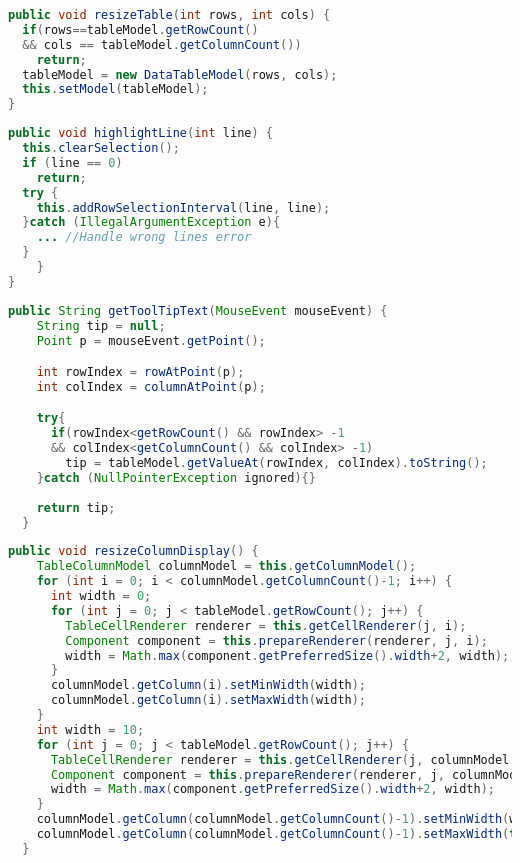 \begin{lstlisting}[language=Java, caption={Implementierung der resizeTable(int, int) Methode}, label={cde:resizeTable}]
public void resizeTable(int rows, int cols) {
  if(rows==tableModel.getRowCount() 
  && cols == tableModel.getColumnCount())
    return;
  tableModel = new DataTableModel(rows, cols);
  this.setModel(tableModel);
}
\end{lstlisting}

\begin{lstlisting}[language=Java, caption={Implementierung der highlightLine(int) Methode}, label={cde:highlightLine}]
public void highlightLine(int line) {
  this.clearSelection();
  if (line == 0)
    return;
  try {
    this.addRowSelectionInterval(line, line);
  }catch (IllegalArgumentException e){
    ... //Handle wrong lines error
  }
    }
}
\end{lstlisting}

\begin{lstlisting}[language=Java, caption={Implementierung der getToolTipText(MouseEvent) Methode}, label={cde:tooltip}]
  public String getToolTipText(MouseEvent mouseEvent) {
    String tip = null;
    Point p = mouseEvent.getPoint();

    int rowIndex = rowAtPoint(p);
    int colIndex = columnAtPoint(p);

    try{
      if(rowIndex<getRowCount() && rowIndex> -1
      && colIndex<getColumnCount() && colIndex> -1)
        tip = tableModel.getValueAt(rowIndex, colIndex).toString();
    }catch (NullPointerException ignored){}
    
    return tip;
  }
\end{lstlisting}

\begin{lstlisting}[language=java, caption={Implementierung der resizeColumnDisplay() Methode}, label={cde:resize}]
  public void resizeColumnDisplay() {
    TableColumnModel columnModel = this.getColumnModel();
    for (int i = 0; i < columnModel.getColumnCount()-1; i++) {
      int width = 0;
      for (int j = 0; j < tableModel.getRowCount(); j++) {
        TableCellRenderer renderer = this.getCellRenderer(j, i);
        Component component = this.prepareRenderer(renderer, j, i);
        width = Math.max(component.getPreferredSize().width+2, width);
      }
      columnModel.getColumn(i).setMinWidth(width);
      columnModel.getColumn(i).setMaxWidth(width);
    }
    int width = 10;
    for (int j = 0; j < tableModel.getRowCount(); j++) {
      TableCellRenderer renderer = this.getCellRenderer(j, columnModel.getColumnCount()-1);
      Component component = this.prepareRenderer(renderer, j, columnModel.getColumnCount()-1);
      width = Math.max(component.getPreferredSize().width+2, width);
    }
    columnModel.getColumn(columnModel.getColumnCount()-1).setMinWidth(width);
    columnModel.getColumn(columnModel.getColumnCount()-1).setMaxWidth(this.getMaximumSize().width);
  }
\end{lstlisting}




